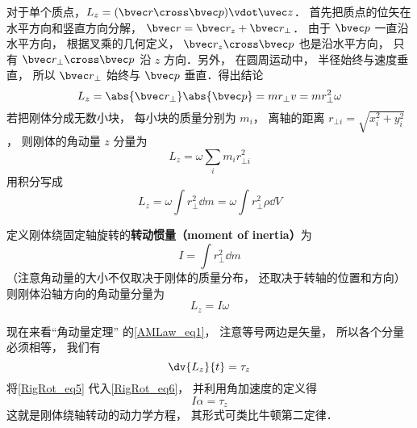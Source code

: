 对于单个质点，$L_z = ( \bvec r \cross \bvec p ) \vdot \uvec z$． 首先把质点的位矢在水平方向和竖直方向分解， $\bvec r = \bvec r_z + \bvec r_ \bot$． 由于 $\bvec p$ 一直沿水平方向， 根据叉乘的几何定义， $\bvec r_z \cross \bvec p$ 也是沿水平方向， 只有 $\bvec r_ \bot \cross \bvec p$ 沿 $z$ 方向．另外， 在圆周运动中， 半径始终与速度垂直， 所以 $\bvec r_ \bot$ 始终与 $\bvec p$ 垂直．得出结论
\begin{equation}
L_z = \abs{\bvec r_\bot} \abs{\bvec p} = m r_ \bot v = mr_ \bot ^2\omega 
\end{equation}
若把刚体分成无数小块， 每小块的质量分别为 $m_i$， 离轴的距离 $r_{\bot i} = \sqrt{x_i^2 + y_i^2} $， 则刚体的角动量 $z$ 分量为
\begin{equation}
L_z = \omega \sum_i m_i r_{ \bot i}^2
\end{equation}
用积分写成
\begin{equation}
L_z = \omega \int r_ \bot ^2 \dd{m} = \omega \int r_ \bot ^2\rho  \dd{V} 
\end{equation}

定义刚体绕固定轴旋转的\textbf{转动惯量（moment of inertia）}为
\begin{equation}
I = \int r_ \bot ^2 \dd{m} 
\end{equation}
（注意角动量的大小不仅取决于刚体的质量分布， 还取决于转轴的位置和方向）则刚体沿轴方向的角动量分量为
\begin{equation}\label{RigRot_eq5}
L_z = I \omega 
\end{equation}

现在来看“角动量定理” 的\autoref{AMLaw_eq1}， 注意等号两边是矢量， 所以各个分量必须相等， 我们有
\begin{equation}\label{RigRot_eq6}
\dv{L_z}{t} = \tau_z
\end{equation}
将\autoref{RigRot_eq5} 代入\autoref{RigRot_eq6}， 并利用角加速度的定义得
\begin{equation}\label{RigRot_eq7}
I\alpha = \tau_z
\end{equation}
这就是刚体绕轴转动的动力学方程， 其形式可类比牛顿第二定律．

